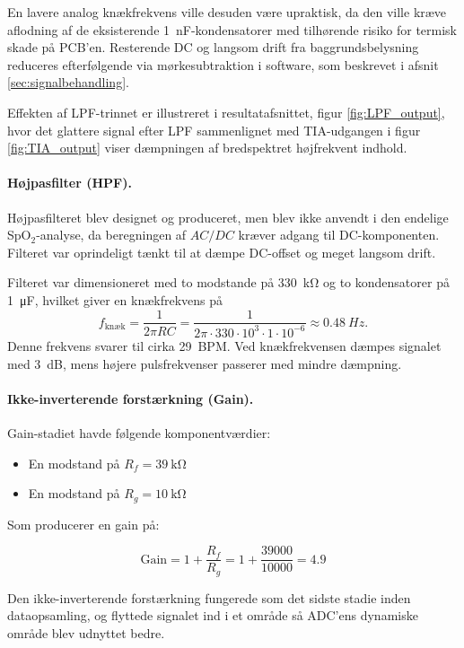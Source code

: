En lavere analog knækfrekvens ville desuden være upraktisk, da den ville kræve aflodning af de eksisterende \SI{1}{nF}-kondensatorer med tilhørende risiko for termisk skade på PCB'en. Resterende DC og langsom drift fra baggrundsbelysning reduceres efterfølgende via mørkesubtraktion i software, som beskrevet i afsnit \ref{sec:signalbehandling}.

Effekten af LPF-trinnet er illustreret i resultatafsnittet, figur \ref{fig:LPF_output}, hvor det glattere signal efter LPF sammenlignet med TIA-udgangen i figur \ref{fig:TIA_output} viser dæmpningen af bredspektret højfrekvent indhold.

\paragraph{Højpasfilter (HPF).}
Højpasfilteret blev designet og produceret, men blev ikke anvendt i den endelige SpO$_2$-analyse, da beregningen af $AC/DC$ kræver adgang til DC-komponenten. Filteret var oprindeligt tænkt til at dæmpe DC-offset og meget langsom drift.

Filteret var dimensioneret med to modstande på \SI{330}{\kilo\ohm} og to kondensatorer på \SI{1}{\micro\farad}, hvilket giver en knækfrekvens på
\[
    f_{\text{knæk}}=\frac{1}{2\pi RC}
    =\frac{1}{2\pi\cdot 330\cdot 10^3\cdot 1\cdot 10^{-6}}
    \approx \SI{0.48}{Hz}.
\]
Denne frekvens svarer til cirka \SI{29}{BPM}. Ved knækfrekvensen dæmpes signalet med \SI{3}{dB}, mens højere pulsfrekvenser passerer med mindre dæmpning.

\paragraph{Ikke-inverterende forstærkning (Gain).}
Gain-stadiet havde følgende komponentværdier:
\begin{itemize}
    \item En modstand på $R_f = \SI{39}{\kilo\ohm}$
    \item En modstand på $R_g = \SI{10}{\kilo\ohm}$
\end{itemize}

Som producerer en gain på:

\begin{equation}
    \text{Gain} = 1 + \frac{R_f}{R_g} = 1 + \frac{39000}{10000} = 4.9
\end{equation}

Den ikke-inverterende forstærkning fungerede som det sidste stadie inden dataopsamling, og flyttede signalet ind i et område så ADC'ens dynamiske område blev udnyttet bedre.

